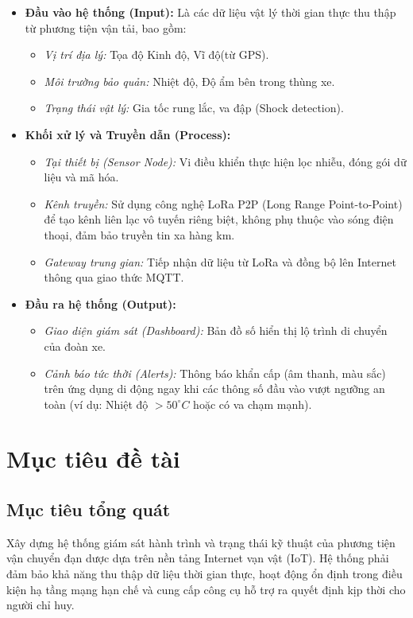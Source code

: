 \begin{itemize}
    \item \textbf{Đầu vào hệ thống (Input):} Là các dữ liệu vật lý thời gian thực thu thập từ phương tiện vận tải, bao gồm:
        \begin{itemize}
            \item \textit{Vị trí địa lý:} Tọa độ Kinh độ, Vĩ độ(từ GPS).
            \item \textit{Môi trường bảo quản:} Nhiệt độ, Độ ẩm bên trong thùng xe.
            \item \textit{Trạng thái vật lý:} Gia tốc rung lắc, va đập (Shock detection).
        \end{itemize}
    
    \item \textbf{Khối xử lý và Truyền dẫn (Process):}
        \begin{itemize}
            \item \textit{Tại thiết bị (Sensor Node):} Vi điều khiển thực hiện lọc nhiễu, đóng gói dữ liệu và mã hóa.
            \item \textit{Kênh truyền:} Sử dụng công nghệ LoRa P2P (Long Range Point-to-Point) để tạo kênh liên lạc vô tuyến riêng biệt, không phụ thuộc vào sóng điện thoại, đảm bảo truyền tin xa hàng km.
            \item \textit{Gateway trung gian:} Tiếp nhận dữ liệu từ LoRa và đồng bộ lên Internet thông qua giao thức MQTT.
        \end{itemize}
        
    \item \textbf{Đầu ra hệ thống (Output):}
        \begin{itemize}
            \item \textit{Giao diện giám sát (Dashboard):} Bản đồ số hiển thị lộ trình di chuyển của đoàn xe.
            \item \textit{Cảnh báo tức thời (Alerts):} Thông báo khẩn cấp (âm thanh, màu sắc) trên ứng dụng di động ngay khi các thông số đầu vào vượt ngưỡng an toàn (ví dụ: Nhiệt độ $> 50^\circ C$ hoặc có va chạm mạnh).
        \end{itemize}
\end{itemize}
\section{Mục tiêu đề tài}
\subsection{Mục tiêu tổng quát}
Xây dựng hệ thống giám sát hành trình và trạng thái kỹ thuật của phương tiện vận chuyển đạn dược dựa trên nền tảng Internet vạn vật (IoT). Hệ thống phải đảm bảo khả năng thu thập dữ liệu thời gian thực, hoạt động ổn định trong điều kiện hạ tầng mạng hạn chế và cung cấp công cụ hỗ trợ ra quyết định kịp thời cho người chỉ huy.

